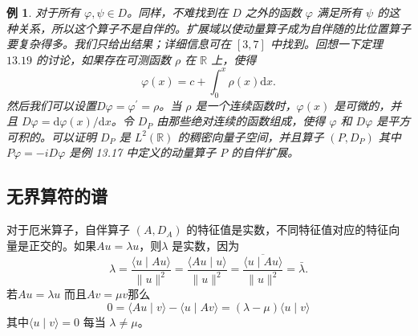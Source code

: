 \documentclass[hyperref,UTF8]{ctexbook}
\newtheorem{eg}{例}[chapter]
\begin{document}
\begin{eg}
对于所有 \(\varphi, \psi \in D\)。同样，不难找到在 \(D\) 之外的函数 \(\varphi\) 满足所有 \(\psi\) 的这种关系，所以这个算子不是自伴的。扩展域以使动量算子成为自伴随的比位置算子要复杂得多。我们只给出结果；详细信息可在 \([3,7]\) 中找到。回想一下定理 \(13.19\) 的讨论，如果存在可测函数 \(\rho\) 在 \(\mathbb{R}\) 上，使得
\[\varphi(x)=c+\int_{0}^{x} \rho(x) \mathrm{d} x .\]
然后我们可以设置\(D \varphi=\varphi^{\prime}=\rho\)。当 \(\rho\) 是一个连续函数时，\(\varphi(x)\) 是可微的，并且 \(D \varphi=\mathrm{d} \varphi(x) / \mathrm{d} x\)。令 \(D_{P}\) 由那些绝对连续的函数组成，使得 \(\varphi\) 和 \(D\varphi\) 是平方可积的。可以证明 \(D_{P}\) 是 \(L^{2}(\mathbb{R})\) 的稠密向量子空间，并且算子 \(\left(P, D_{P} \right)\) 其中 \(P \varphi=-i D \varphi\) 是例 13.17 中定义的动量算子 \(P\) 的自伴扩展。
\end{eg}
\subsection{无界算符的谱}
对于厄米算子，自伴算子 \(\left(A, D_{A}\right)\) 的特征值是实数，不同特征值对应的特征向量是正交的。如果\(A u=\lambda u\)，则\(\lambda\) 是实数，因为
\[
\lambda=\frac{\langle u \mid A u\rangle}{\|u\|^{2}}=\frac{\langle A u \mid u\rangle}{\|u\|^{2}}=\frac{\overline{\langle u \mid A u\rangle}}{\|u\|^{2}}=\bar{\lambda} .
\]
若\(A u=\lambda u\) 而且\(A v=\mu v\)那么
\[
0=\langle A u \mid v\rangle-\langle u \mid A v\rangle=(\lambda-\mu)\langle u \mid v\rangle
\]
其中\(\langle u \mid v\rangle=0\) 每当 \(\lambda \neq \mu\)。
\end{document}
